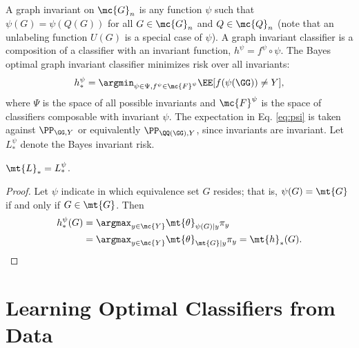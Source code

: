 \documentclass[10pt,journal,cspaper,compsoc]{IEEEtran}
\newcommand{\Qs}{Q}
\begin{document}
A graph invariant on $\mc{G}_n$ is any function $\psi$  such that $\psi(G)=\psi(\Qs(G))$ for all $G \in \mc{G}_n$ and $\Qs \in \mc{Q}_n$ (note that an unlabeling function $U(G)$ is a special case of $\psi$).  A graph invariant classifier is a composition of a classifier with an invariant function, $h^\psi=f^\psi \circ \psi$.  The Bayes optimal graph invariant classifier minimizes risk over all invariants: 
\begin{align} \label{eq:psi}
	h_*^{\psi}=\argmin_{\psi \in \Psi, f^{\psi} \in \mc{F}^{\psi}} \EE[f(\psi(\GG))\neq Y],
\end{align}
where $\Psi$ is the space of all possible invariants and $\mc{F}^{\psi}$ is the space of classifiers composable with invariant $\psi$. The expectation in Eq. \eqref{eq:psi} is taken against $\PP_{\GG,Y}$ or equivalently $\PP_{\QQ(\GG),Y}$, since invariants are invariant.
  Let $L_*^{\psi}$ denote the Bayes invariant risk.  
\begin{thm} \label{thm:3}
	$\mt{L}_*=L_*^\psi$.
\end{thm}

\begin{proof}
Let $\psi$ indicate in which equivalence set $G$ resides; that is,  $\psi(G)=\mt{G}$ if and only if $G \in \mt{G}$.  Then
\begin{align}
	h^{\psi}_*(G) &= \argmax_{y \in \mc{Y}} \mt{\theta}_{\psi(G)|y} \pi_y \nonumber \\
	&= \argmax_{y \in \mc{Y}} \mt{\theta}_{\mt{G}|y} \pi_y = \mt{h}_*(G).
\end{align}
\end{proof}



\section{Learning Optimal Classifiers from Data} %
\label{sec:learning_optimal_classifiers_from_data}
\end{document}
